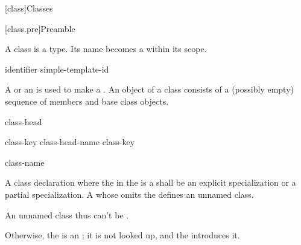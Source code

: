 [class]{Classes}%



[class.pre]{Preamble}

\pnum
{}%
%
%
%
A class is a type.
%
Its name becomes a  within its
scope.

\begin{bnf}
\br
    identifier\br
    simple-template-id
\end{bnf}

A  or
an  is used to
make a . An object of a class consists of a
(possibly empty) sequence of members and base class objects.

\begin{bnf}
\br
    class-head \terminal{\{}  \terminal{\}}
\end{bnf}

\begin{bnf}
\br
    class-key  class-head-name  \br
    class-key  
\end{bnf}

\begin{bnf}
\br
     class-name
\end{bnf}

\begin{bnf}
\br
\end{bnf}

\begin{bnf}
\br
    \br
    \br
\end{bnf}

A class declaration where the 
in the  is a 
shall be an explicit specialization or
a partial specialization.
A  whose
 omits the
 defines an unnamed class.
\begin{note}
An unnamed class thus can't
be .
\end{note}
Otherwise, the  is an ;
it is not looked up, and the  introduces it.

